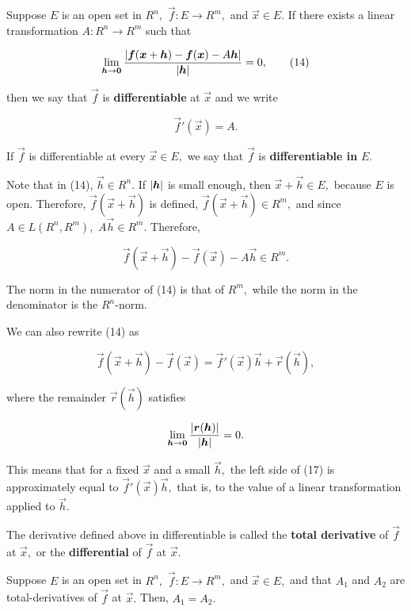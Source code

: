 \documentclass{article}
\begin{document}
\begin{definition}[Differentiable]
Suppose $E$ is an \@{open} \@{set} in $R^n,$ $\vec{f} : E \to R^m,$ and $\vec{x} \in E.$ If there exists a linear transformation $A : R^n \to R^m$ such that

\[ \lim_{\boldsymbol{h} \to \boldsymbol{0}} \frac{\left| \boldsymbol{f}(\boldsymbol{x} + \boldsymbol{h}) - \boldsymbol{f}(\boldsymbol{x}) - A\boldsymbol{h} \right|}{\left| \boldsymbol{h} \right|} = 0, \tag{14} \]

then we say that $\vec{f}$ is \textbf{differentiable} at $\vec{x}$ and we write

\[ \vec{f}'(\vec{x}) = A. \]

If $\vec{f}$ is differentiable at every $\vec{x} \in E,$ we say that $\vec{f}$ is \textbf{differentiable in} $E.$

Note that in (14), $\vec{h} \in R^n.$ If $\left| \boldsymbol{h} \right|$ is small enough, then $\vec{x} + \vec{h} \in E,$ because $E$ is \@{open}. Therefore, $\vec{f}(\vec{x} + \vec{h})$ is defined, $\vec{f}(\vec{x} + \vec{h}) \in R^m,$ and since $A \in L(R^n, R^m),$ $A \vec{h} \in R^m.$ Therefore,

\[ \vec{f}(\vec{x} + \vec{h}) - \vec{f}(\vec{x}) - A \vec{h} \in R^m. \]

The \@{norm} in the numerator of (14) is that of $R^m,$ while the norm in the denominator is the $R^n$-norm.

We can also rewrite (14) as

\[ \vec{f}(\vec{x} + \vec{h}) - \vec{f}(\vec{x}) = \vec{f}'(\vec{x})\vec{h} + \vec{r}(\vec{h}), \tag{17} \]

where the remainder $\vec{r}(\vec{h})$ satisfies

\[ \lim_{\boldsymbol{h} \to \boldsymbol{0}} \frac{\left| \boldsymbol{r}(\boldsymbol{h}) \right|}{\left| \boldsymbol{h} \right|} = 0. \]

This means that for a fixed $\vec{x}$ and a small $\vec{h},$ the left side of (17) is approximately equal to $\vec{f}'(\vec{x})\vec{h},$ that is, to the value of a linear transformation applied to $\vec{h}.$
\end{definition}

\begin{definition}
The derivative defined above in \@{differentiable} is called the \textbf{total derivative} of $\vec{f}$ at $\vec{x},$ or the \textbf{differential} of $\vec{f}$ at $\vec{x}.$
\end{definition}

\begin{theorem}\label{total-derivatives-are-unique}
Suppose $E$ is an \@{open} \@{set} in $R^n,$ $\vec{f} : E \to R^m,$ and $\vec{x} \in E,$ and that $A_1$ and $A_2$ are \@{total-derivatives} of $\vec{f}$ at $\vec{x}.$  Then, $A_1 = A_2.$
\end{theorem}
\end{document}

